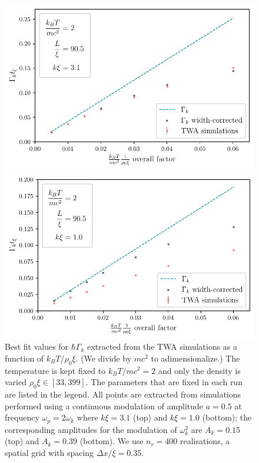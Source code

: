 \documentclass[aps,prd,notitlepage,amsfonts,amssymb,amsmath,nofootinbib,superscriptaddress,longbibliography]{revtex4-2}
\begin{document}
\begin{figure}
    \centering
    \begin{minipage}{0.49\textwidth}
        \centering
        \includegraphics[width=\textwidth]{fig5a.pdf}
    \end{minipage} \hfill
    \begin{minipage}{0.49\textwidth}
        \centering
         \includegraphics[width=\textwidth]{fig5b.pdf}
    \end{minipage}
    \caption{Best fit values for $\hbar \Gamma_{k}$ extracted from the TWA simulations as a function of $k_{B} T/ \rho_{0}\xi$.
    (We divide by $mc^{2}$ to adimensionalize.) The temperature is kept fixed to $k_{B} T/ mc^2 = 2$ and only the density is varied $\rho_0 \xi \in \left[ 33 , 399 \right]$. The parameters that are fixed in each run are listed in the legend.
    All points are extracted from simulations performed using a continuous modulation of amplitude $a = 0.5$ at frequency $\omega_{p} = 2 \omega_{k}$ where $k \xi = 3.1$ (top) and $k \xi = 1.0$ (bottom); the corresponding amplitudes for the modulation of $\omega_{k}^{2}$ are $A_{k} = 0.15$ (top) and $A_{k} = 0.39$ (bottom). We use $n_r = 400$ realisations, a spatial grid with spacing $\Delta x/\xi = 0.35$.
}
\end{figure}
\end{document}
